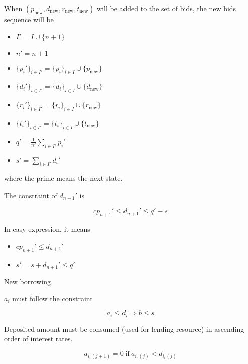 \documentclass[dvipdfmx]{jsarticle}
\begin{document}
When $(p_{\text{new}}, d_{\text{new}}, r_{\text{new}}, t_{\text{new}})$ will be added to the set of bids, the new bids sequence will be

\begin{itemize}
  \item $I' = I \cup \{n+1\}$
  \item $n' = n + 1$
  \item $\{p_i'\}_{i \in I'} = \{p_i\}_{i \in I} \cup \{p_{\text{new}}\}$
  \item $\{d_i'\}_{i \in I'} = \{d_i\}_{i \in I} \cup \{d_{\text{new}}\}$
  \item $\{r_i'\}_{i \in I'} = \{r_i\}_{i \in I} \cup \{r_{\text{new}}\}$
  \item $\{t_i'\}_{i \in I'} = \{t_i\}_{i \in I} \cup \{t_{\text{new}}\}$
  \item $q' = \frac{1}{n'} \sum_{i \in I'} p_i'$
  \item $s' = \sum_{i \in I'} d_i'$
\end{itemize}

where the prime means the next state.

The constraint of $d_{n+1}'$ is

$$
  c p_{n+1}' \le d_{n+1}' \le q' - s
$$

In easy expression, it means

\begin{itemize}
  \item $c p_{n+1}' \le d_{n+1}'$
  \item $s' = s + d_{n+1}' \le q'$
\end{itemize}

New borrowing

$a_i$ must follow the constraint

$$
  a_i \le d_i \Rightarrow b \le s
$$

Deposited amount must be consumed (used for lending resource) in ascending order of interest rates.

$$
  a_{i_r(j+1)} = 0 \ \text{if} \ a_{i_r(j)} < d_{i_r(j)}
$$
\end{document}
